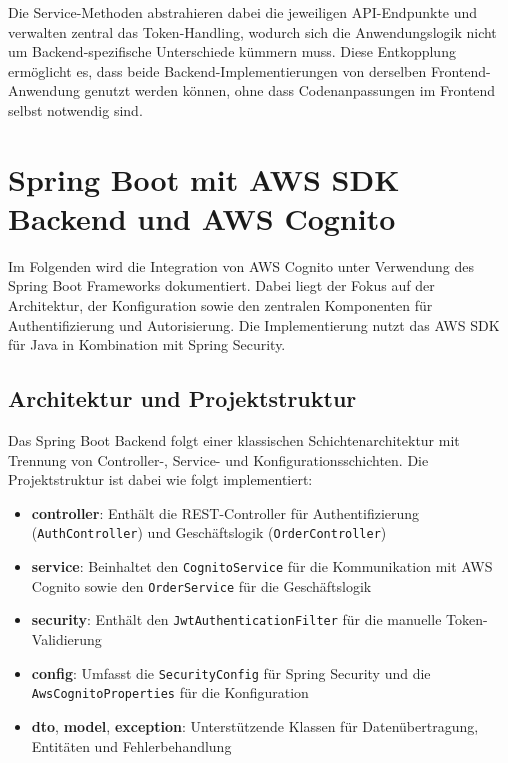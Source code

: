 Die Service-Methoden abstrahieren dabei die jeweiligen API-Endpunkte und verwalten zentral das Token-Handling, wodurch sich die Anwendungslogik nicht um Backend-spezifische Unterschiede kümmern muss. Diese Entkopplung ermöglicht es, dass beide Backend-Implementierungen von derselben Frontend-Anwendung genutzt werden können, ohne dass Codenanpassungen im Frontend selbst notwendig sind.


\section{Spring Boot mit AWS SDK Backend und AWS Cognito}
\label{sec:spring_backend}

Im Folgenden wird die Integration von \ac{AWS} Cognito unter Verwendung des Spring Boot Frameworks dokumentiert. Dabei liegt der Fokus auf der Architektur, der Konfiguration sowie den zentralen Komponenten für Authentifizierung und Autorisierung. Die Implementierung nutzt das \ac{AWS} \ac{SDK} für Java in Kombination mit Spring Security.

\subsection{Architektur und Projektstruktur}

Das Spring Boot Backend folgt einer klassischen Schichtenarchitektur mit Trennung von Controller-, Service- und Konfigurationsschichten. Die Projektstruktur ist dabei wie folgt implementiert:

\begin{itemize}
    \item \textbf{controller}: Enthält die REST-Controller für Authentifizierung (\texttt{AuthController}) und Geschäftslogik (\texttt{OrderController})
    \item \textbf{service}: Beinhaltet den \texttt{CognitoService} für die Kommunikation mit \ac{AWS} Cognito sowie den \texttt{OrderService} für die Geschäftslogik
    \item \textbf{security}: Enthält den \texttt{JwtAuthenticationFilter} für die manuelle Token-Validierung
    \item \textbf{config}: Umfasst die \texttt{SecurityConfig} für Spring Security und die \texttt{AwsCognitoProperties} für die Konfiguration
    \item \textbf{dto}, \textbf{model}, \textbf{exception}: Unterstützende Klassen für Datenübertragung, Entitäten und Fehlerbehandlung
\end{itemize}

